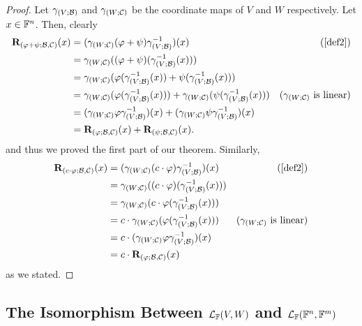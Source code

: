 \begin{proof}
    Let $\gamma_{(V; \mathcal{B})}$ and $\gamma_{(W; \mathcal{C})}$ be the coordinate maps of $V$
    and $W$ respectively. Let $x \in \mathbb{F}^{n}$. Then, clearly
    \begin{align*}
        \rep{\varphi + \psi}(x) &= (\compthr{\comap{W}{\C}}{(\varphi + \psi)}{\comap{V}{\B}^{-1}})(x)                                                 &\text{(\cref{def2})} \\
                                &= \comap{W}{\C}((\varphi + \psi)(\comap{V}{\B}^{-1}(x))) \\
                                &= \comap{W}{\C}(\varphi(\comap{V}{\B}^{-1}(x)) + \psi(\comap{V}{\B}^{-1}(x))) \\
                                &= \comap{W}{\C}(\varphi(\comap{V}{\B}^{-1}(x))) + \comap{W}{\C}(\psi(\comap{V}{\B}^{-1}(x)))                         &\text{($\comap{W}{\C}$ is linear)} \\
                                &= (\compthr{\comap{W}{\C}}{\varphi}{\comap{V}{\B}^{-1}})(x) + (\compthr{\comap{W}{\C}}{\psi}{\comap{V}{\B}^{-1}})(x) \\
                                &= \rep{\varphi}(x) + \rep{\psi}(x).                                  
    \end{align*}
    and thus we proved the first part of our theorem. Similarly,
    \begin{align*}
        \rep{c \cdot \varphi}(x) &= (\compthr{\comap{W}{\C}}{(c \cdot \varphi)}{\comap{V}{\B}^{-1}})(x) &\text{(\cref{def2})} \\
                                 &= \comap{W}{\C}((c \cdot \varphi)(\comap{V}{\B}^{-1}(x))) \\
                                 &= \comap{W}{\C}(c \cdot \varphi(\comap{V}{\B}^{-1}(x))) \\
                                 &= c \cdot \comap{W}{\C}(\varphi(\comap{V}{\B}^{-1}(x)))               &\text{($\comap{W}{\C}$ is linear)} \\
                                 &= c \cdot (\compthr{\comap{W}{\C}}{\varphi}{\comap{V}{\B}^{-1}})(x) \\
                                 &= c \cdot \rep{\varphi}(x)     				
    \end{align*}
    as we stated.
\end{proof}


\subsection{The Isomorphism Between $\mathcal{L}_{\mathbb{F}}(V, W)$ and $\mathcal{L}_{\mathbb{F}}(\mathbb{F}^{n}, \mathbb{F}^{m})$}

